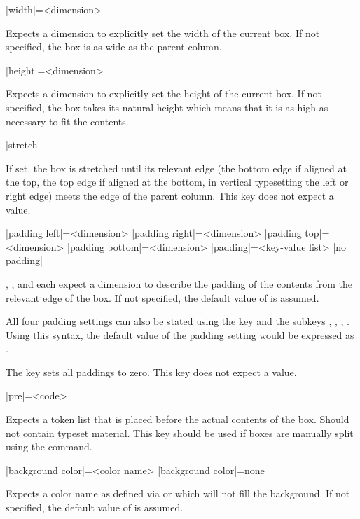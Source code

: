 \documentclass[a4paper]{article}
\begin{document}
\begin{macrodef}
|width|={<dimension>}
\end{macrodef}
Expects a dimension to explicitly set the width of the current box. If not specified, the box is as wide as the parent column.

\begin{macrodef}
|height|={<dimension>}
\end{macrodef}
Expects a dimension to explicitly set the height of the current box. If not specified, the box takes its natural height which means that it is as high as necessary to fit the contents.

\begin{macrodef}
|stretch|
\end{macrodef}
If set, the box is stretched until its relevant edge (the bottom edge if aligned at the top, the top edge if aligned at the bottom, in vertical typesetting the left or right edge) meets the edge of the parent column. This key does not expect a value.

\begin{macrodef}
|padding left|={<dimension>}
|padding right|={<dimension>}
|padding top|={<dimension>}
|padding bottom|={<dimension>}
|padding|={<key-value list>}
|no padding|
\end{macrodef}
, ,  and  each expect a dimension to describe the padding of the contents from the relevant edge of the box. If not specified, the default value of \macro{7.5mm} is assumed.

All four padding settings can also be stated using the  key and the subkeys , , , . Using this syntax, the default value of the padding setting would be expressed as .

The key  sets all paddings to zero. This key does not expect a value.

\begin{macrodef}
|pre|={<code>}
\end{macrodef}
Expects a token list that is placed before the actual contents of the box. Should not contain typeset material. This key should be used if boxes are manually split using the \macro{\leporelloboxbreak} command.

\begin{macrodef}
|background color|={<color name>}
|background color|={none}
\end{macrodef}
Expects a color name as defined via  or  which will not fill the background. If not specified, the default value of  is assumed.
\end{document}
